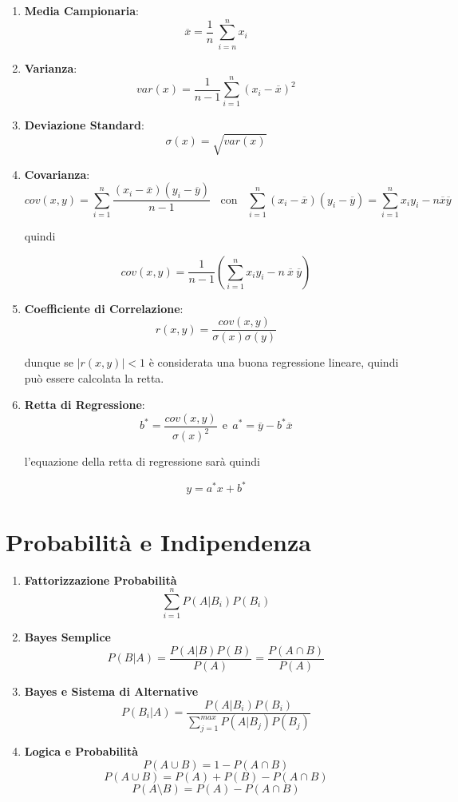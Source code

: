 \documentclass{article}
\begin{document}
\begin{enumerate}
    \item \textbf{Media Campionaria}:
    \[ \boxed{\overline{x} = \frac{1}{n} \: \sum_{i=n}^{n} x_{i} } \]
    \item \textbf{Varianza}:
    \[ \boxed{var(x) = \frac{1}{n-1} \sum_{i=1}^{n} (x_{i} - \overline{x})^{2} } \]
    \item \textbf{Deviazione Standard}:
    \[ \boxed{\sigma(x) = \sqrt{var(x)}} \]
    \item \textbf{Covarianza}:
    \[ \boxed{cov(x,y) = \sum_{i=1}^{n} \frac{(x_{i} - \overline{x})(y_{i} - \overline{y})}{n-1} } \:\:\:\: \text{con} \:\:\:\: \boxed{\sum_{i=1}^{n} (x_{i} - \overline{x})(y_{i} - \overline{y}) = \sum_{i=1}^{n} x_{i}y_{i} - n \overline{x}\overline{y} }\]
    \begin{center}
        quindi
    \end{center}
    \[ \boxed{cov(x,y) = \frac{1}{n-1} \left( \sum_{i=1}^{n} x_{i}y_{i} - n\:\overline{x}\:\overline{y} \right)} \]
    \item \textbf{Coefficiente di Correlazione}:
    \[ \boxed{r(x,y) = \frac{cov(x,y)}{\sigma(x)\sigma(y)}} \]
    \begin{center}
        dunque se $|r(x,y)| < 1$ è considerata una buona regressione lineare, quindi può essere calcolata la retta.
    \end{center}
    \item \textbf{Retta di Regressione}:
    \[ \boxed{b^{*} = \frac{cov(x,y)}{\sigma(x)^{2}}} \:\: \text{e} \:\: \boxed{a^{*} = \overline{y} - b^{*}\overline{x}} \]
    \begin{center}
        l'equazione della retta di regressione sarà quindi
    \end{center}
    \[ \boxed{y = a^{*}x + b^{*}} \]
\end{enumerate}

\newpage

\section{Probabilità e Indipendenza}

\begin{enumerate}
    \item \textbf{Fattorizzazione Probabilità}
    \[ \boxed{\sum_{i=1}^{n} P(A | B_{i}) P(B_{i}) } \]
    \item \textbf{Bayes Semplice}
    \[ \boxed{P(B|A) = \frac{P(A|B)P(B)}{P(A)} = \frac{P(A \cap B)}{P(A)}} \]
    \item \textbf{Bayes e Sistema di Alternative}
    \[ \boxed{P(B_{i}|A) = \frac{P(A|B_{i})P(B_{i})}{\sum_{j=1}^{max}P(A|B_{j})P(B_{j})}} \]
    \item \textbf{Logica e Probabilità}
    \[ \boxed{P(A \cup B) = 1 - P(A \cap B)}\]
    \[ \boxed{P(A \cup B) = P(A) + P(B) - P(A \cap B)} \]
    \[ \boxed{P(A \setminus B)= P(A) - P(A \cap B) } \]
\end{enumerate}
\end{document}
